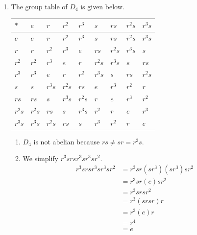 \begin{enumerate}
    \item The group table of $D_4$ is given below.
    \begin{table}[h]
        \centering
        \begin{tabular}{|l|l|l|l|l|l|l|l|l|}
        \hline
        $\ast$ & $e$    & $r$    & $r^2$  & $r^3$  & $s$    & $rs$   & $r^2s$ & $r^3s$ \\ \hline
        $e$    & $e$    & $r$    & $r^2$  & $r^3$  & $s$    & $rs$   & $r^2s$ & $r^3s$ \\ \hline
        $r$    & $r$    & $r^2$  & $r^3$  & $e$    & $rs$   & $r^2s$ & $r^3s$ & $s$    \\ \hline
        $r^2$  & $r^2$  & $r^3$  & $e$    & $r$    & $r^2s$ & $r^3s$ & $s$    & $rs$   \\ \hline
        $r^3$  & $r^3$  & $e$    & $r$    & $r^2$  & $r^3s$ & $s$    & $rs$   & $r^2s$ \\ \hline
        $s$    & $s$    & $r^3s$ & $r^2s$ & $rs$   & $e$    & $r^3$  & $r^2$  & $r$    \\ \hline
        $rs$   & $rs$   & $s$    & $r^3s$ & $r^2s$ & $r$    & $e$    & $r^3$  & $r^2$  \\ \hline
        $r^2s$ & $r^2s$ & $rs$   & $s$    & $r^3s$ & $r^2$  & $r$    & $e$    & $r^3$  \\ \hline
        $r^3s$ & $r^3s$ & $r^2s$ & $rs$   & $s$    & $r^3$  & $r^2$  & $r$    & $e$    \\ \hline
        \end{tabular}
    \end{table}
    \begin{enumerate}[label=(\alph*)]
        \item $D_4$ is not abelian because $rs \neq sr = r^3s$.
        \item We simplify $r^3srsr^3sr^3sr^2$.
        \begin{align*}
            r^3srsr^3sr^3sr^2 &= r^3sr(sr^3)(sr^3)sr^2\\
            &= r^3sr(e)sr^2\\
            &= r^3srsr^2\\
            &= r^3(srsr)r\\
            &= r^3(e)r\\
            &= r^4\\
            &= e
        \end{align*}
    \end{enumerate}


\end{enumerate}
